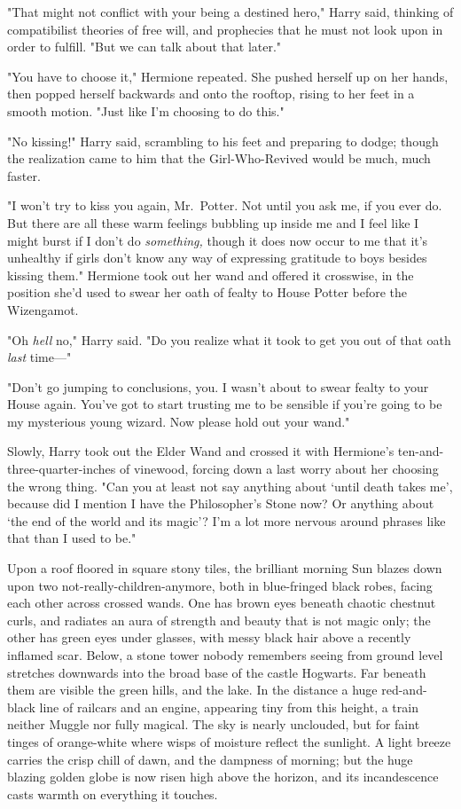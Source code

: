 "That might not conflict with your being a destined hero," Harry said, thinking
of compatibilist theories of free will, and prophecies that he must not look
upon in order to fulfill. "But we can talk about that later."

"You have to choose it," Hermione repeated. She pushed herself up on her hands,
then popped herself backwards and onto the rooftop, rising to her feet in a
smooth motion. "Just like I'm choosing to do this."

"No kissing!" Harry said, scrambling to his feet and preparing to dodge; though
the realization came to him that the Girl-Who-Revived would be much, much
faster.

"I won't try to kiss you again, Mr.~Potter. Not until you ask me, if you ever
do. But there are all these warm feelings bubbling up inside me and I feel like
I might burst if I don't do \emph{something,} though it does now occur to me
that it's unhealthy if girls don't know any way of expressing gratitude to boys
besides kissing them." Hermione took out her wand and offered it crosswise, in
the position she'd used to swear her oath of fealty to House Potter before the
Wizengamot.

"Oh \emph{hell} no," Harry said. "Do you realize what it took to get you out of
that oath \emph{last} time\mbox{---}"

"Don't go jumping to conclusions, you. I wasn't about to swear fealty to your
House again. You've got to start trusting me to be sensible if you're going to
be my mysterious young wizard. Now please hold out your wand."

Slowly, Harry took out the Elder Wand and crossed it with Hermione's
ten-and-three-quarter-inches of vinewood, forcing down a last worry about her
choosing the wrong thing. "Can you at least not say anything about `until death
takes me', because did I mention I have the Philosopher's Stone now? Or
anything about `the end of the world and its magic'? I'm a lot more nervous
around phrases like that than I used to be."

\sbreak

Upon a roof floored in square stony tiles, the brilliant morning Sun blazes
down upon two not-really-children-anymore, both in blue-fringed black robes,
facing each other across crossed wands. One has brown eyes beneath chaotic
chestnut curls, and radiates an aura of strength and beauty that is not magic
only; the other has green eyes under glasses, with messy black hair above a
recently inflamed scar. Below, a stone tower nobody remembers seeing from
ground level stretches downwards into the broad base of the castle Hogwarts.
Far beneath them are visible the green hills, and the lake. In the distance a
huge red-and-black line of railcars and an engine, appearing tiny from this
height, a train neither Muggle nor fully magical. The sky is nearly unclouded,
but for faint tinges of orange-white where wisps of moisture reflect the
sunlight. A light breeze carries the crisp chill of dawn, and the dampness of
morning; but the huge blazing golden globe is now risen high above the horizon,
and its incandescence casts warmth on everything it touches.

